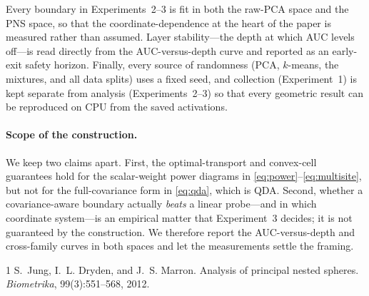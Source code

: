 Every boundary in Experiments~2--3 is fit in both the raw-PCA space and the PNS space, so that
the coordinate-dependence at the heart of the paper is measured rather than assumed. Layer
stability---the depth at which AUC levels off---is read directly from the AUC-versus-depth curve
and reported as an early-exit safety horizon. Finally, every source of randomness (PCA, $k$-means,
the mixtures, and all data splits) uses a fixed seed, and collection (Experiment~1) is kept
separate from analysis (Experiments~2--3) so that every geometric result can be reproduced on CPU
from the saved activations.

\paragraph{Scope of the construction.}
We keep two claims apart. First, the optimal-transport and convex-cell guarantees hold for the
scalar-weight power diagrams in \eqref{eq:power}--\eqref{eq:multisite}, but not for the
full-covariance form in \eqref{eq:qda}, which is QDA. Second, whether a covariance-aware boundary
actually \emph{beats} a linear probe---and in which coordinate system---is an empirical matter
that Experiment~3 decides; it is not guaranteed by the construction. We therefore report the
AUC-versus-depth and cross-family curves in both spaces and let the measurements settle the
framing.

\begin{thebibliography}{1}
\small
{}
S.~Jung, I.~L. Dryden, and J.~S. Marron.
\newblock Analysis of principal nested spheres.
\newblock \emph{Biometrika}, 99(3):551--568, 2012.
\end{thebibliography}


